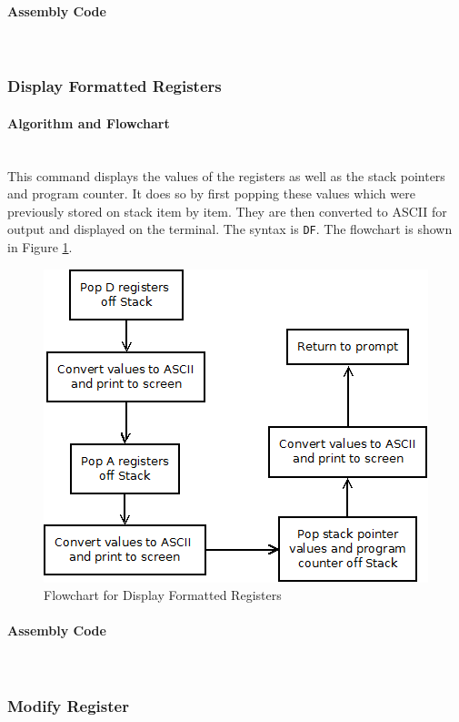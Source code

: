 \documentclass[12pt]{article}
\begin{document}
			\paragraph{Assembly Code}~\\				
			
			\subsubsection{Display Formatted Registers}
		
			\paragraph{Algorithm and Flowchart}~\\
				This command displays the values of the registers as well as the stack pointers and program counter. It does so by first popping these values which were previously stored on stack item by item. They are then converted to ASCII for output and displayed on the terminal. The syntax is \texttt{DF}. The flowchart is shown in Figure \ref{fig:DF}.
			
			
\begin{figure}[H]
\centering
\includegraphics[width=0.7\linewidth]{DF}
\caption{Flowchart for Display Formatted Registers}
\label{fig:DF}
\end{figure}
			\paragraph{Assembly Code}~\\				
			
			\subsubsection{Modify Register}
		
\end{document}
